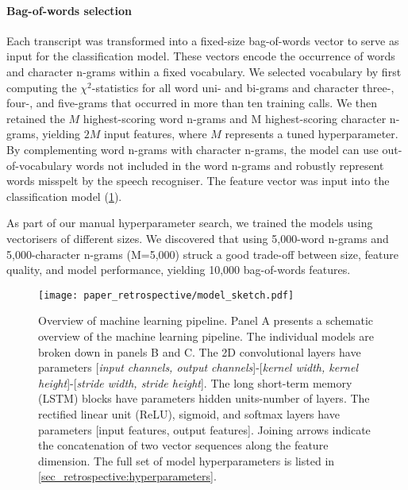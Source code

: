 {\begin{table}
{\begin{tabular}{l|l|l}
        \bottomrule
    \end{tabular}%
    \vspace{-2mm}
    }
\end{table}


\paragraph{Bag-of-words selection}

Each transcript was transformed into a fixed-size bag-of-words vector to serve as input for the classification model. These vectors encode the occurrence of words and character n-grams within a fixed vocabulary. We selected vocabulary by first computing the $\chi^2$-statistics for all word uni- and bi-grams and character three-, four-, and five-grams that occurred in more than ten training calls. We then retained the $M$ highest-scoring word n-grams and M highest-scoring character n-grams, yielding $2M$ input features, where $M$ represents a tuned hyperparameter. By complementing word n-grams with character n-grams, the model can use out-of-vocabulary words not included in the word n-grams and robustly represent words misspelt by the speech recogniser. The feature vector was input into the classification model (\cref{fig_retrospective:model_sketch}).

As part of our manual hyperparameter search, we trained the models using vectorisers of different sizes. We discovered that using 5,000-word n-grams and 5,000-character n-grams (M=5,000) struck a good trade-off between size, feature quality, and model performance, yielding 10,000 bag-of-words features.

\begin{figure}[t]
    \centering
    \texttt{[image: paper\_retrospective/model\_sketch.pdf]}
    \caption[Overview of machine learning pipeline for stroke recognition.]{Overview of machine learning pipeline. Panel A presents a schematic overview of the machine learning pipeline. The individual models are broken down in panels B and C. The 2D convolutional layers have parameters [\textit{input channels, output channels}]-[\textit{kernel width, kernel height}]-[\textit{stride width, stride height}]. The long short-term memory (LSTM) blocks have parameters hidden units-number of layers. The rectified linear unit (ReLU), sigmoid, and softmax layers have parameters [input features, output features]. Joining arrows indicate the concatenation of two vector sequences along the feature dimension. The full set of model hyperparameters is listed in \cref{sec_retrospective:hyperparameters}.}
    \label{fig_retrospective:model_sketch}
\end{figure}

}
